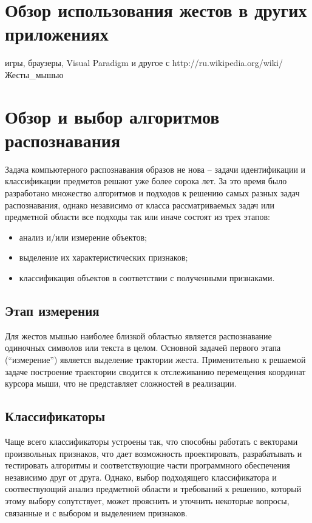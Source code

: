 \documentclass[a5paper]{article}
\begin{document}
\section{Обзор использования жестов в других приложениях}

игры, браузеры, Visual Paradigm и другое с http://ru.wikipedia.org/wiki/Жесты\_мышью

\section{Обзор и выбор алгоритмов распознавания}
Задача компьютерного распознавания образов не нова -- задачи идентификации и классификации предметов решают уже более сорока лет. За это 
время было разработано множество алгоритмов и подходов к решению самых разных задач распознавания, однако независимо от класса 
рассматриваемых задач или предметной области все подходы так или иначе состоят из трех этапов: 
\begin{itemize}
  \item анализ и/или измерение объектов;
  \item выделение их характеристических признаков;
  \item классификация объектов в соответствии с полученными признаками.
\end{itemize}

\subsection{Этап измерения}
Для жестов мышью наиболее близкой областью является распознавание одиночных символов или текста в целом. Основной задачей первого этапа 
(``измерение'') является выделение трактории жеста. Применительно к решаемой задаче построение траектории сводится к отслеживанию 
перемещения координат курсора мыши, что не представляет сложностей в реализации. 

\subsection{Классификаторы}

Чаще всего классификаторы устроены так, что способны работать с векторами произвольных признаков, что дает возможность
проектировать, разрабатывать и тестировать алгоритмы и соответствующие части программного обеспечения независимо друг от друга. Однако, 
выбор подходящего классификатора и соотвествующий анализ предметной области и требований к решению, который этому выбору сопутствует, 
может прояснить и уточнить некоторые вопросы, связанные и с выбором и выделением признаков. 
\end{document}
